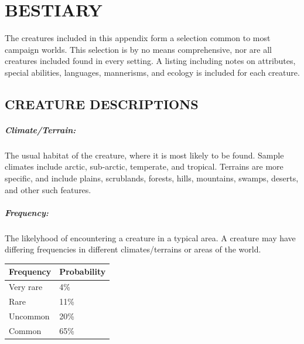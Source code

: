 \chapter{BESTIARY}


\begin{multicols}{2}

The creatures included in this appendix form a selection common to most campaign worlds. This selection is by no means comprehensive, nor are all creatures included found in every setting. A listing including notes on attributes, special abilities, languages, mannerisms, and ecology is included for each creature.

\section{CREATURE DESCRIPTIONS}

\paragraph{Climate/Terrain:} The usual habitat of the creature, where it is most likely to be found. Sample climates include arctic, sub-arctic, temperate, and tropical. Terrains are more specific, and include plains, scrublands, forests, hills, mountains, swamps, deserts, and other such features.

\paragraph{Frequency:} The likelyhood of encountering a creature in a typical area. A creature may have differing frequencies in different climates/terrains or areas of the world.

\noindent
\begin{minipage}{\columnwidth}

\noindent
\begin{tabular}{|p{}|p{}|}
\hline
Frequency	& Probability \\
\hline\hline
\rowcolor[gray]{.9}Very rare	& 4\% \\
Rare		& 11\% \\
\rowcolor[gray]{.9}Uncommon	& 20\% \\
Common		& 65\% \\
\hline
\end{tabular}


\end{minipage}
\end{multicols}
